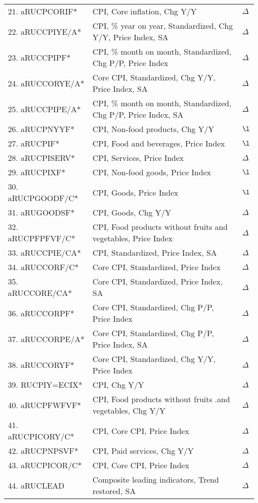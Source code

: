 \documentclass[a4paper, 14pt]{article}
\begin{document}
\begin{center}
\begin{longtable}{p{5.5cm} p{10cm} p{0.15cm}}
	21. aRUCPCORIF* &  CPI, Core inflation, Chg Y/Y & $\Delta$\\
	22. aRUCCPIYE/A* &  CPI, \% year on year, Standardized, Chg Y/Y, Price Index, SA & $\Delta$\\
	23. aRUCCPIPF* &  CPI, \% month on month, Standardized, Chg P/P, Price Index & $\Delta$\\
	24. aRUCCORYE/A* &  Core CPI, Standardized, Chg Y/Y, Price Index, SA & $\Delta$\\
	25. aRUCCPIPE/A* &  CPI, \% month on month, Standardized, Chg P/P, Price Index, SA & $\Delta$\\
	26. aRUCPNYYF* &  CPI, Non-food products, Chg Y/Y & $\l$\\
	27. aRUCPIF* &  CPI, Food and beverages, Price Index & $\l$\\
	28. aRUCPISERV* &  CPI, Services, Price Index & $\Delta$\\
	29. aRUCPIXF* &  CPI, Non-food goods, Price Index & $\l$\\
	30. aRUCPGOODF/C* &  CPI, Goods, Price Index & $\l$\\
	31. aRUGOODSF* &  CPI, Goods, Chg Y/Y & $\Delta$\\
	32. aRUCPFPFVF/C* &  CPI, Food products without fruits and vegetables, Price Index & $\Delta$\\
	33. aRUCCPIE/CA* &  CPI, Standardized, Price Index, SA & $\Delta$\\
	34. aRUCCORF/C* &  Core CPI, Standardized, Price Index & $\Delta$\\
	35. aRUCCORE/CA* &  Core CPI, Standardized, Price Index, SA & $\Delta$\\
	36. aRUCCORPF* &  Core CPI, Standardized, Chg P/P, Price Index & $\Delta$\\
	37. aRUCCORPE/A* &  Core CPI, Standardized, Chg P/P, Price Index, SA & $\Delta$\\
	38. aRUCCORYF* &  Core CPI, Standardized, Chg Y/Y, Price Index & $\Delta$\\
	39. RUCPIY=ECIX* &  CPI, Chg Y/Y & $\Delta$\\
	40. aRUCPFWFVF* &  CPI, Food products without fruits .and vegetables, Chg Y/Y & $\Delta$\\
	41. aRUCPICORY/C* &  CPI, Core CPI, Price Index & $\Delta$\\
	42. aRUCPNPSVF* &  CPI, Paid services, Chg Y/Y & $\Delta$\\
	43. aRUCPICOR/C* &  CPI, Core CPI, Price Index & $\Delta$\\
	44. aRUCLEAD &  Composite leading indicators, Trend restored, SA & $\Delta$\\

\end{longtable}
\end{center}
\end{document}
